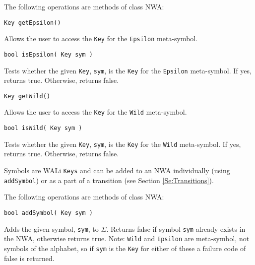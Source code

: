 \noindent The following operations are methods of class NWA:

\begin{description}

  \item\texttt{Key getEpsilon()} \nopagebreak

    Allows the user to access the \texttt{Key} for the \texttt{Epsilon}
    meta-symbol.

  \item\texttt{bool isEpsilon( Key sym )} \nopagebreak

    Tests whether the given \texttt{Key}, \texttt{sym}, is the \texttt{Key}
    for the \texttt{Epsilon} meta-symbol.  If yes, returns true.  Otherwise,
    returns false.

  \item\texttt{Key getWild()} \nopagebreak

    Allows the user to access the \texttt{Key} for the \texttt{Wild}
    meta-symbol.

  \item\texttt{bool isWild( Key sym )} \nopagebreak
 
    Tests whether the given \texttt{Key}, \texttt{sym}, is the \texttt{Key}
    for the \texttt{Wild} meta-symbol. If yes, returns true.  Otherwise,
    returns false. \\

\end{description}

Symbols are WALi \texttt{Keys} and can be added to an NWA
individually (using \texttt{addSymbol}) or as a part of a transition (see
Section \ref{Se:Transitions}).

 \clearpage

\noindent The following operations are methods of class NWA:

\begin{description}

  \item\texttt{bool addSymbol( Key sym )} \nopagebreak

    Adds the given symbol, \texttt{sym}, to $\Sigma$.  Returns false if
    symbol \texttt{sym} already exists in the NWA, otherwise returns true.
    Note: \texttt{Wild} and \texttt{Epsilon} are meta-symbol, not symbols of
    the alphabet, so if \texttt{sym} is the \texttt{Key} for either of these
    a failure code of false is returned.

\end{description}

